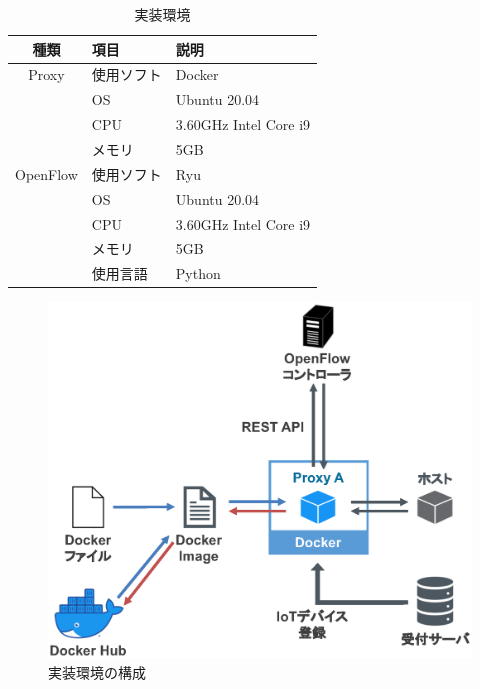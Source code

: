 \documentclass[Japanese]{dicomopapers}
\begin{document}
\begin{table}[!bt]
	\caption{実装環境}
	\label{tab:program}
	\centering
	\begin{tabular}{|c|l|l|}
		\hline
		種類     & 項目       & 説明                  \\
		\hline \hline
		Proxy    & 使用ソフト & Docker                \\
		         & OS         & Ubuntu 20.04          \\
		         & CPU        & 3.60GHz Intel Core i9 \\
		         & メモリ     & 5GB                   \\
		\hline
		OpenFlow & 使用ソフト & Ryu                   \\
		         & OS         & Ubuntu 20.04          \\
		         & CPU        & 3.60GHz Intel Core i9 \\
		         & メモリ     & 5GB                   \\
		         & 使用言語   & Python                \\
		\hline
	\end{tabular}
\end{table}

\begin{figure}[!tb]
	\centering
	\includegraphics[width=\linewidth]{img/program.eps}
	\caption{実装環境の構成}
	\label{fig:program}
\end{figure}
\end{document}
